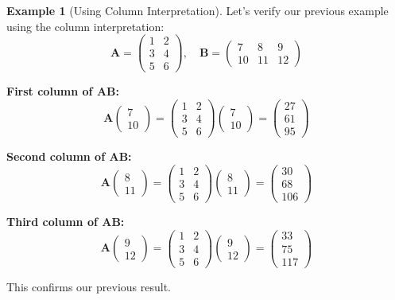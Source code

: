 \documentclass[12pt]{article}
\numberwithin{equation}{section}
\newcommand{\mat}[1]{\mathbf{#1}}        %
\theoremstyle{plain}
\theoremstyle{definition}
\newtheorem{example}[theorem]{Example}
\theoremstyle{remark}
\begin{document}
\begin{example}[Using Column Interpretation]
Let's verify our previous example using the column interpretation:
$$\mat{A} = \begin{pmatrix} 1 & 2 \\ 3 & 4 \\ 5 & 6 \end{pmatrix}, \quad \mat{B} = \begin{pmatrix} 7 & 8 & 9 \\ 10 & 11 & 12 \end{pmatrix}$$

\textbf{First column of $\mat{A}\mat{B}$:}
$$\mat{A}\begin{pmatrix} 7 \\ 10 \end{pmatrix} = \begin{pmatrix} 1 & 2 \\ 3 & 4 \\ 5 & 6 \end{pmatrix}\begin{pmatrix} 7 \\ 10 \end{pmatrix} = \begin{pmatrix} 27 \\ 61 \\ 95 \end{pmatrix}$$

\textbf{Second column of $\mat{A}\mat{B}$:}
$$\mat{A}\begin{pmatrix} 8 \\ 11 \end{pmatrix} = \begin{pmatrix} 1 & 2 \\ 3 & 4 \\ 5 & 6 \end{pmatrix}\begin{pmatrix} 8 \\ 11 \end{pmatrix} = \begin{pmatrix} 30 \\ 68 \\ 106 \end{pmatrix}$$

\textbf{Third column of $\mat{A}\mat{B}$:}
$$\mat{A}\begin{pmatrix} 9 \\ 12 \end{pmatrix} = \begin{pmatrix} 1 & 2 \\ 3 & 4 \\ 5 & 6 \end{pmatrix}\begin{pmatrix} 9 \\ 12 \end{pmatrix} = \begin{pmatrix} 33 \\ 75 \\ 117 \end{pmatrix}$$

This confirms our previous result.
\end{example}
\end{document}
